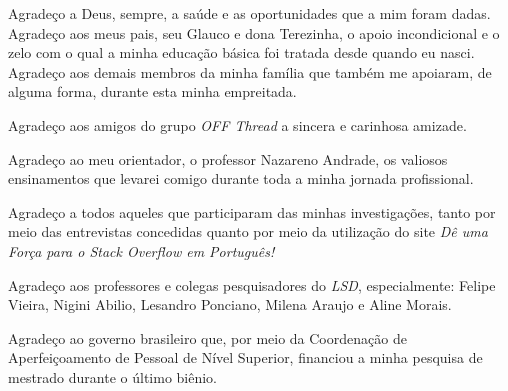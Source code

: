 Agradeço a Deus, sempre, a saúde e as oportunidades que a mim foram dadas. Agradeço aos meus pais, seu Glauco e dona Terezinha, o apoio incondicional e o zelo com o qual a minha educação básica foi tratada desde quando eu nasci. Agradeço aos demais membros da minha família que também me apoiaram, de alguma forma, durante esta minha empreitada.

Agradeço aos amigos do grupo \textit{OFF Thread} a sincera e carinhosa amizade.

Agradeço ao meu orientador, o professor Nazareno Andrade, os valiosos ensinamentos que levarei comigo durante toda a minha jornada profissional.

Agradeço a todos aqueles que participaram das minhas investigações, tanto por meio das entrevistas concedidas quanto por meio da utilização do site \textit{Dê uma Força para o Stack Overflow em Português!}

Agradeço aos professores e colegas pesquisadores do \textit{LSD}, especialmente: Felipe Vieira, Nigini Abilio, Lesandro Ponciano, Milena Araujo e Aline Morais.

Agradeço ao governo brasileiro que, por meio da Coordenação de Aperfeiçoamento de Pessoal de Nível Superior, financiou a minha pesquisa de mestrado durante o último biênio.